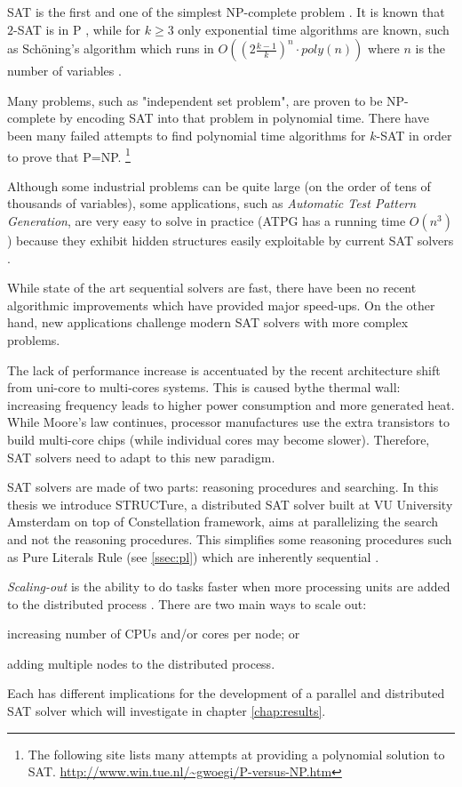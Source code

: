 SAT is the first and one of the simplest NP-complete problem
\cite{Cook:1971:CTP:800157.805047}. It is known that $2$-SAT is in
P \cite{karp}, while for $k \ge 3$ only exponential time algorithms
are known, such as Sch\"{o}ning's algorithm which runs in $O((2\frac{k
- 1}{k})^n \cdot poly(n))$ where $n$ is the number of variables
\cite{Schoning:1999:PAK:795665.796524}.

Many problems, such as "independent set problem", are proven to be
NP-complete by encoding SAT into that problem in polynomial time.
There have been many failed attempts to find polynomial time
algorithms for $k$-SAT in order to prove that P=NP.  \footnote{The
following site lists many attempts at providing a polynomial solution
to SAT. \url{http://www.win.tue.nl/~gwoegi/P-versus-NP.htm}}

Although some industrial problems can be quite large (on the order
of tens of thousands of variables), some applications, such
as \emph{Automatic Test Pattern Generation}, are very easy to
solve in practice (ATPG has a running time $O(n^3)$) because they
exhibit hidden structures easily exploitable by current SAT solvers
\cite{Prasad:1999:WAE:309847.309857}.

While state of the art sequential solvers are fast, there have
been no recent algorithmic improvements which have provided major
speed-ups. On the other hand, new applications challenge modern
SAT solvers with more complex problems.

The lack of performance increase is accentuated by the recent
architecture shift from uni-core to multi-cores systems. This is
caused bythe thermal wall: increasing frequency leads to
higher power consumption and more generated heat. While Moore's
law continues, processor manufactures use the extra transistors
to build multi-core chips (while individual cores may become slower).
Therefore, SAT solvers need to adapt to this new paradigm.

SAT solvers are made of two parts: reasoning procedures and
searching. In this thesis we introduce STRUCTure, a distributed
SAT solver built at VU University Amsterdam on top of Constellation
framework, aims at parallelizing the search and not the reasoning
procedures. This simplifies some reasoning procedures such as Pure
Literals Rule (see \ref{ssec:pl}) which are inherently sequential
\cite{Johannsen:2005:CPL:1166822.1166834}.

\emph{Scaling-out} is the ability to do tasks faster when
more processing units are added to the distributed process
\cite{citeulike:1567858}. There are two main ways to scale
out:
\begin{inparaenum}[a)]
  \item increasing number of CPUs and/or cores per node; or
  \item adding multiple nodes to the distributed process.
\end{inparaenum} Each has different implications for the development
of a parallel and distributed SAT solver which will investigate in
chapter \ref{chap:results}.


